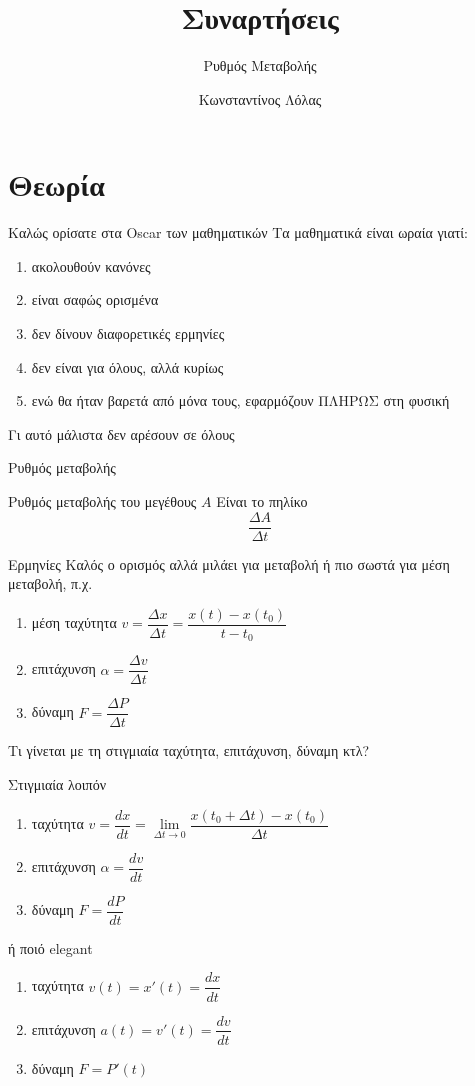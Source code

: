 \documentclass{presentation}
\title{Συναρτήσεις}
\subtitle{Ρυθμός Μεταβολής}
\author[Λόλας]{Κωνσταντίνος Λόλας}
\begin{document}
\begin{frame}
  \titlepage
\end{frame}

\section{Θεωρία}
\begin{frame}{Καλώς ορίσατε στα Oscar των μαθηματικών}
  Τα μαθηματικά είναι ωραία γιατί:
  \begin{enumerate}
    \item<1-> ακολουθούν κανόνες
    \item<2-> είναι σαφώς ορισμένα
    \item<3-> δεν δίνουν διαφορετικές ερμηνίες
    \item<4-> δεν είναι για όλους, αλλά κυρίως
    \item<5-> ενώ θα ήταν βαρετά από μόνα τους, εφαρμόζουν ΠΛΗΡΩΣ στη φυσική
  \end{enumerate}
   Γι αυτό μάλιστα δεν αρέσουν σε όλους
\end{frame}

\begin{frame}{Ρυθμός μεταβολής}
  \begin{block}{Ρυθμός μεταβολής του μεγέθους $A$}
    Είναι το πηλίκο
    $$\frac{ΔA}{Δt}$$
  \end{block}
\end{frame}

\begin{frame}{Ερμηνίες}
  Καλός ο ορισμός αλλά μιλάει για μεταβολή ή πιο σωστά για μέση μεταβολή, π.χ.
  \begin{enumerate}
    \item<1-> μέση ταχύτητα $v=\dfrac{Δx}{Δt}=\dfrac{x(t)-x(t_0)}{t-t_0}$
    \item<2-> επιτάχυνση $α=\dfrac{Δv}{Δt}$
    \item<3-> δύναμη $F=\dfrac{ΔP}{Δt}$
  \end{enumerate}
   Τι γίνεται με τη στιγμιαία ταχύτητα, επιτάχυνση, δύναμη κτλ?
\end{frame}

\begin{frame}{Στιγμιαία λοιπόν}
  \begin{enumerate}
    \item<1-> ταχύτητα $v=\dfrac{dx}{dt}=\lim\limits_{Δt \to 0}{ \dfrac{x(t_0+Δt) - x(t_0)}{Δt} }$
    \item<2-> επιτάχυνση $α=\dfrac{dv}{dt}$
    \item<3-> δύναμη $F=\dfrac{dP}{dt}$
  \end{enumerate}
   ή ποιό elegant
  \begin{enumerate}
    \item<5-> ταχύτητα $v(t)=x'(t)=\dfrac{dx}{dt}$
    \item<6-> επιτάχυνση $a(t)=v'(t)=\dfrac{dv}{dt}$
    \item<7-> δύναμη $F=P'(t)$
  \end{enumerate}
\end{frame}
\end{document}
